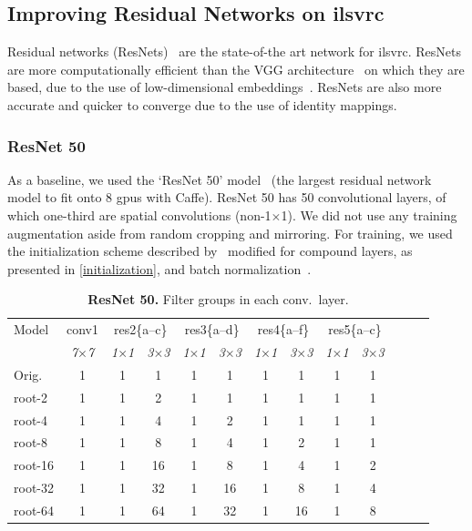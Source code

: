 \documentclass[thesis]{subfiles}
\begin{document}
	\subsection{Improving Residual Networks on \gls{ilsvrc}}
	Residual networks (ResNets)~\citep{He2015} are the state-of-the art network for \gls{ilsvrc}\@. ResNets are more computationally efficient than the VGG architecture~\citep{Simonyan2014verydeep} on which they are based, due to the use of low-dimensional embeddings~\citep{Lin2013NiN}. ResNets are also more accurate and quicker to converge due to the use of identity mappings.
	
	\subsubsection{ResNet 50}
	\label{resnet50results}
	As a baseline, we used the `ResNet 50' model~\citep{He2015} (the largest residual network model to fit onto 8 \gls{gpu}s with Caffe). ResNet 50 has 50 convolutional layers, of which one-third are spatial convolutions (non-1$\times$1). We did not use any training augmentation aside from random cropping and mirroring. 
	For training, we used the initialization scheme described by~\citep{He2015b} modified for compound layers, as presented in \cref{initialization}, and batch normalization~\citep{Ioffe2015}.
	\begin{table}[tp]
		\caption[ResNet 50 root architectures]{\textbf{ResNet 50.} Filter groups in each conv.\ layer.}
		\label{table:resnet50config}
		\centering
		\begin{tabular}{@{}lcccccccccccc@{}}
			\toprule
			Model & conv1 & \multicolumn{2}{c}{res2\{a--c\}} & \multicolumn{2}{c}{res3\{a--d\}} & \multicolumn{2}{c}{res4\{a--f\}} & \multicolumn{2}{c}{res5\{a--c\}} \\
			& \textit{\footnotesize7$\times$7} & \textit{\footnotesize1$\times$1} & \textit{\footnotesize3$\times$3} & \textit{\footnotesize1$\times$1} & \textit{\footnotesize3$\times$3} & \textit{\footnotesize1$\times$1} & \textit{\footnotesize3$\times$3} & \textit{\footnotesize1$\times$1} & \textit{\footnotesize3$\times$3} \\
			Orig. & 1 & 1 & 1 & 1 &  1 & 1 &  1 & 1 & 1 \\
			\midrule
			root-2 & 1 & 1 & 2 & 1 &  1 & 1 &  1 & 1 & 1 \\
			root-4 & 1 & 1 & 4 & 1 &  2 & 1 &  1 & 1 & 1 \\
			root-8 & 1 & 1 & 8 & 1 &  4 & 1 &  2 & 1 & 1 \\
			root-16 & 1 & 1 & 16 & 1 &  8 & 1 &  4 & 1 & 2 \\
			root-32 & 1 & 1 & 32 & 1 & 16 & 1 &  8 & 1 & 4 \\
			root-64 & 1 & 1 & 64 & 1 & 32 & 1 & 16 & 1 & 8 \\
			\bottomrule
		\end{tabular}
	\end{table}
\end{document}
